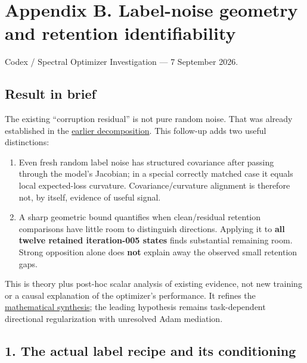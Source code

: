 \documentclass[
  british,
  10pt,
  a4paper,
]{article}
\providecommand{\tightlist}{%
  \setlength{\itemsep}{0pt}\setlength{\parskip}{0pt}}
\begin{document}
\clearpage

\section{\texorpdfstring{Appendix B. Label-\allowbreak{}noise geometry
and retention
identifiability}{Appendix B.  geometry and retention identifiability}}\label{label-noise}

Codex / Spectral Optimizer Investigation --- 7 September 2026.

\subsection{Result in brief}\label{label-noise--result-in-brief}

The existing ``corruption residual'' is not pure random noise. That was
already established in the
\href{../continuation/label-noise-gradient-decomposition.md}{earlier
decomposition}. This follow-up adds two useful distinctions:

\begin{enumerate}
\def\labelenumi{\arabic{enumi}.}
\tightlist
\item
  Even fresh random label noise has structured covariance after passing
  through the model's Jacobian; in a special correctly matched case it
  equals local expected-\allowbreak{}loss curvature.
  Covariance/\allowbreak{}curvature alignment is therefore not, by
  itself, evidence of useful signal.
\item
  A sharp geometric bound quantifies when clean/\allowbreak{}residual
  retention comparisons have little room to distinguish
  directions.\allowbreak{} Applying it to \textbf{all twelve retained
  iteration-\allowbreak{}005 states} finds substantial remaining room.
  Strong opposition alone does \textbf{not} explain away the observed
  small retention gaps.
\end{enumerate}

This is theory plus post-hoc scalar analysis of existing evidence, not
new training or a causal explanation of the optimizer's
performance.\allowbreak{} It refines the
\hyperref[mathematics]{mathematical synthesis}; the leading hypothesis
remains task-\allowbreak{}dependent directional regularization with
unresolved Adam mediation.

\subsection{1. The actual label recipe and its
conditioning}\label{label-noise--the-actual-label-recipe-and-its-conditioning}
\end{document}
